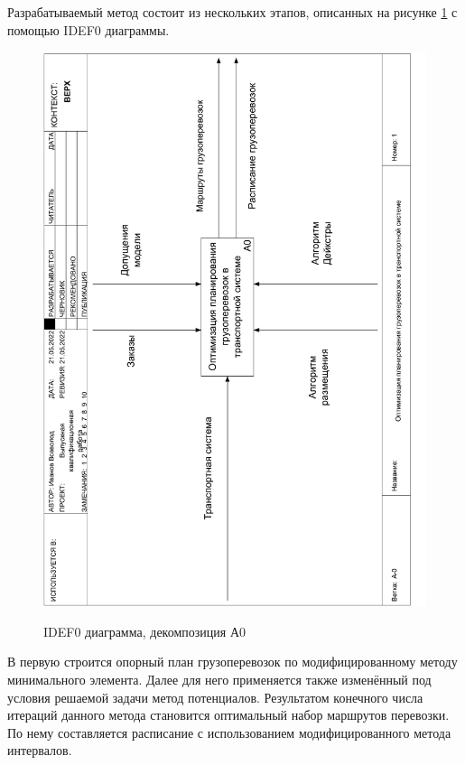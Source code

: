 Разрабатываемый метод состоит из нескольких этапов, описанных на рисунке \ref{idef0:A0} с помощью IDEF0 диаграммы.

\begin{figure}[h]
	\begin{center}
		{\includegraphics[scale=0.63, angle=-90, page=2]{img/idef0.pdf}}
		\caption{IDEF0 диаграмма, декомпозиция А0}
		\label{idef0:A0}
	\end{center}
\end{figure}
В первую строится опорный план грузоперевозок по модифицированному методу минимального элемента. Далее для него применяется также изменённый под условия решаемой задачи метод потенциалов. Результатом конечного числа итераций данного метода становится оптимальный набор маршрутов перевозки. По нему составляется расписание с использованием модифицированного метода интервалов.


